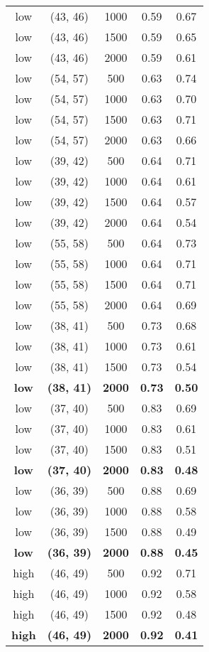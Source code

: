 \begin{tabular}{c c c c c}
low & (43, 46) &  1000 & 0.59 & 0.67 \\
low & (43, 46) &  1500 & 0.59 & 0.65 \\
low & (43, 46) &  2000 & 0.59 & 0.61 \\
low & (54, 57) &  500 & 0.63 & 0.74 \\
low & (54, 57) &  1000 & 0.63 & 0.70 \\
low & (54, 57) &  1500 & 0.63 & 0.71 \\
low & (54, 57) &  2000 & 0.63 & 0.66 \\
low & (39, 42) &  500 & 0.64 & 0.71 \\
low & (39, 42) &  1000 & 0.64 & 0.61 \\
low & (39, 42) &  1500 & 0.64 & 0.57 \\
low & (39, 42) &  2000 & 0.64 & 0.54 \\
low & (55, 58) &  500 & 0.64 & 0.73 \\
low & (55, 58) &  1000 & 0.64 & 0.71 \\
low & (55, 58) &  1500 & 0.64 & 0.71 \\
low & (55, 58) &  2000 & 0.64 & 0.69 \\
low & (38, 41) &  500 & 0.73 & 0.68 \\
low & (38, 41) &  1000 & 0.73 & 0.61 \\
low & (38, 41) &  1500 & 0.73 & 0.54 \\
\textbf{low} & \textbf{(38, 41)} & \textbf{ 2000} & \textbf{0.73} & \textbf{0.50} \\
low & (37, 40) &  500 & 0.83 & 0.69 \\
low & (37, 40) &  1000 & 0.83 & 0.61 \\
low & (37, 40) &  1500 & 0.83 & 0.51 \\
\textbf{low} & \textbf{(37, 40)} & \textbf{ 2000} & \textbf{0.83} & \textbf{0.48} \\
low & (36, 39) &  500 & 0.88 & 0.69 \\
low & (36, 39) &  1000 & 0.88 & 0.58 \\
low & (36, 39) &  1500 & 0.88 & 0.49 \\
\textbf{low} & \textbf{(36, 39)} & \textbf{ 2000} & \textbf{0.88} & \textbf{0.45} \\
high & (46, 49) &  500 & 0.92 & 0.71 \\
high & (46, 49) &  1000 & 0.92 & 0.58 \\
high & (46, 49) &  1500 & 0.92 & 0.48 \\
\textbf{high} & \textbf{(46, 49)} & \textbf{ 2000} & \textbf{0.92} & \textbf{0.41} \\

\end{tabular}

